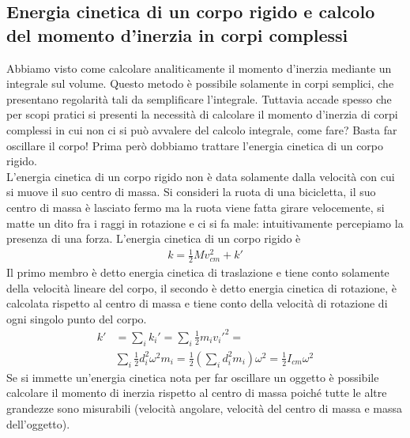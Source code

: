 \documentclass[10pt,a4paper]{article}
\begin{document}
\subsection{Energia cinetica di un corpo rigido e calcolo del momento d'inerzia in corpi complessi}
Abbiamo visto come calcolare analiticamente il momento d'inerzia mediante un integrale sul volume. Questo metodo è possibile solamente in corpi semplici, che presentano regolarità tali da semplificare l'integrale. Tuttavia accade spesso che per scopi pratici si presenti la necessità di calcolare il momento d'inerzia di corpi complessi in cui non ci si può avvalere del calcolo integrale, come fare? Basta far oscillare il corpo! Prima però dobbiamo trattare l'energia cinetica di un corpo rigido.\\
L'energia cinetica di un corpo rigido non è data solamente dalla velocità con cui si muove il suo centro di massa. Si consideri la ruota di una bicicletta, il suo centro di massa è lasciato fermo ma la ruota viene fatta girare velocemente, si matte un dito fra i raggi in rotazione e ci si fa male: intuitivamente percepiamo la presenza di una forza. L'energia cinetica di un corpo rigido è
\begin{align*}
	k = \frac{1}{2}M v_{cm}^2 + k'
\end{align*}
Il primo membro è detto energia cinetica di traslazione e tiene conto solamente della velocità lineare del corpo, il secondo è detto energia cinetica di rotazione, è calcolata rispetto al centro di massa e tiene conto della velocità di rotazione di ogni singolo punto del corpo.
\begin{align*}
	k' &= \sum_i k_i'= \sum_i \frac{1}{2}m_i v_i'^2 =\\
	&\sum_i \frac{1}{2} d_i^2 \omega^2 m_i = \frac{1}{2} (\sum_i d_i^2 m_i) \omega^2 = \frac{1}{2} I_{cm} \omega^2
\end{align*}
Se si immette un'energia cinetica nota per far oscillare un oggetto è possibile calcolare il momento di inerzia rispetto al centro di massa poiché tutte le altre grandezze sono misurabili (velocità angolare, velocità del centro di massa e massa dell'oggetto).
\end{document}

